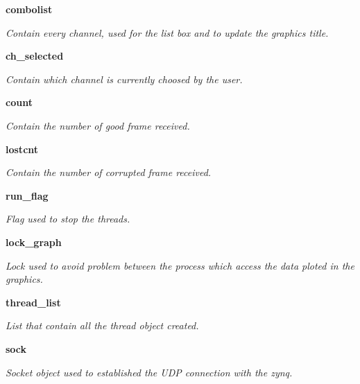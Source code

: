 \begin{DoxyCompactItemize}
\mbox{\label{classreceive_1_1_watchman__graphic__window_a82b71bdb82baf98c78c58a2321fdd9f0}} 
\textbf{ combolist}
\begin{DoxyCompactList}\small\item\em Contain every channel, used for the list box and to update the graphic\textquotesingle{}s title. \end{DoxyCompactList}\item 
\mbox{\label{classreceive_1_1_watchman__graphic__window_ae0ab5cfbc652e296567ea3fceaa4653b}} 
\textbf{ ch\+\_\+selected}
\begin{DoxyCompactList}\small\item\em Contain which channel is currently choosed by the user. \end{DoxyCompactList}\item 
\mbox{\label{classreceive_1_1_watchman__graphic__window_a1a1387a82c47d58d4e1df0a37231b56a}} 
\textbf{ count}
\begin{DoxyCompactList}\small\item\em Contain the number of good frame received. \end{DoxyCompactList}\item 
\mbox{\label{classreceive_1_1_watchman__graphic__window_a0eb1fac8747308313fa466793efbf11a}} 
\textbf{ lostcnt}
\begin{DoxyCompactList}\small\item\em Contain the number of corrupted frame received. \end{DoxyCompactList}\item 
\mbox{\label{classreceive_1_1_watchman__graphic__window_a5cb676b10379ef4bca1aaea969532723}} 
\textbf{ run\+\_\+flag}
\begin{DoxyCompactList}\small\item\em Flag used to stop the threads. \end{DoxyCompactList}\item 
\mbox{\label{classreceive_1_1_watchman__graphic__window_a86426e3c08ed52663f865aee238efbe7}} 
\textbf{ lock\+\_\+graph}
\begin{DoxyCompactList}\small\item\em Lock used to avoid problem between the process which access the data ploted in the graphics. \end{DoxyCompactList}\item 
\mbox{\label{classreceive_1_1_watchman__graphic__window_aacc492360b8abd6f4c0201872fe83bf1}} 
\textbf{ thread\+\_\+list}
\begin{DoxyCompactList}\small\item\em List that contain all the thread object created. \end{DoxyCompactList}\item 
\mbox{\label{classreceive_1_1_watchman__graphic__window_a749f3b55bd96839f25308fea911a4fa6}} 
\textbf{ sock}
\begin{DoxyCompactList}\small\item\em Socket object used to established the U\+DP connection with the zynq. \end{DoxyCompactList}\end{DoxyCompactItemize}


